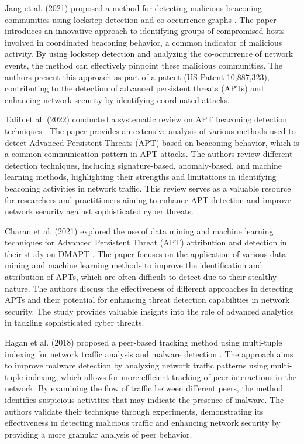 Jang et al. (2021) proposed a method for detecting malicious beaconing communities using lockstep detection and co-occurrence graphs \cite{jang2021detecting}. The paper introduces an innovative approach to identifying groups of compromised hosts involved in coordinated beaconing behavior, a common indicator of malicious activity. By using lockstep detection and analyzing the co-occurrence of network events, the method can effectively pinpoint these malicious communities. The authors present this approach as part of a patent (US Patent 10,887,323), contributing to the detection of advanced persistent threats (APTs) and enhancing network security by identifying coordinated attacks.

Talib et al. (2022) conducted a systematic review on APT beaconing detection techniques \cite{talib2022apt}. The paper provides an extensive analysis of various methods used to detect Advanced Persistent Threats (APT) based on beaconing behavior, which is a common communication pattern in APT attacks. The authors review different detection techniques, including signature-based, anomaly-based, and machine learning methods, highlighting their strengths and limitations in identifying beaconing activities in network traffic. This review serves as a valuable resource for researchers and practitioners aiming to enhance APT detection and improve network security against sophisticated cyber threats.

Charan et al. (2021) explored the use of data mining and machine learning techniques for Advanced Persistent Threat (APT) attribution and detection in their study on DMAPT \cite{charan2021dmapt}. The paper focuses on the application of various data mining and machine learning methods to improve the identification and attribution of APTs, which are often difficult to detect due to their stealthy nature. The authors discuss the effectiveness of different approaches in detecting APTs and their potential for enhancing threat detection capabilities in network security. The study provides valuable insights into the role of advanced analytics in tackling sophisticated cyber threats.

Hagan et al. (2018) proposed a peer-based tracking method using multi-tuple indexing for network traffic analysis and malware detection \cite{hagan2018peer}. The approach aims to improve malware detection by analyzing network traffic patterns using multi-tuple indexing, which allows for more efficient tracking of peer interactions in the network. By examining the flow of traffic between different peers, the method identifies suspicious activities that may indicate the presence of malware. The authors validate their technique through experiments, demonstrating its effectiveness in detecting malicious traffic and enhancing network security by providing a more granular analysis of peer behavior.


